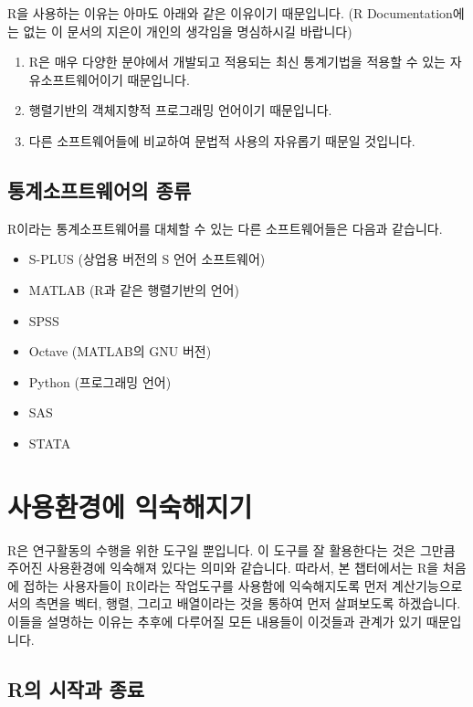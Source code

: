 \documentclass{book}
\begin{document}
R을 사용하는 이유는 아마도 아래와 같은 이유이기 때문입니다. 
(R Documentation에는 없는 이 문서의 지은이 개인의 생각임을 명심하시길 바랍니다)

\begin{enumerate}
	\item R은 매우 다양한 분야에서 개발되고 적용되는 최신 통계기법을 적용할 수 있는 자유소프트웨어이기 때문입니다.
	\item 행렬기반의 객체지향적 프로그래밍 언어이기 때문입니다.
	\item 다른 소프트웨어들에 비교하여 문법적 사용의 자유롭기 때문일 것입니다.
\end{enumerate}


\section{통계소프트웨어의 종류}

R이라는 통계소프트웨어를 대체할 수 있는 다른 소프트웨어들은 다음과 같습니다. 

\begin{itemize}
\item S-PLUS (상업용 버전의 S 언어 소프트웨어)
\item MATLAB (R과 같은 행렬기반의 언어)
\item SPSS
\item Octave (MATLAB의 GNU 버전)
\item Python (프로그래밍 언어)
\item SAS
\item STATA
\end{itemize}


%
%
%
%
%

\chapter{사용환경에 익숙해지기}

R은 연구활동의 수행을 위한 도구일 뿐입니다. 
이 도구를 잘 활용한다는 것은 그만큼 주어진 사용환경에 익숙해져 있다는 의미와 같습니다.
따라서, 본 챕터에서는 R을 처음에 접하는 사용자들이 R이라는 작업도구를 사용함에 익숙해지도록 먼저 계산기능으로서의 측면을 벡터, 행렬, 그리고 배열이라는 것을 통하여 먼저 살펴보도록 하겠습니다.
이들을 설명하는 이유는 추후에 다루어질 모든 내용들이 이것들과 관계가 있기 때문입니다. 


\section{R의 시작과 종료}
\end{document}
